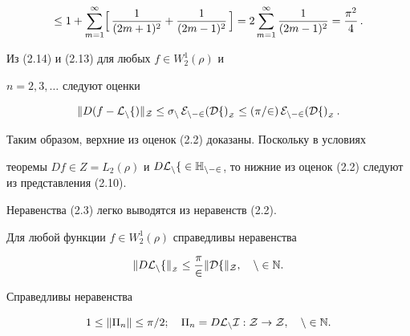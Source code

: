 \begin{pf}
\begin{gather}
%


\le 1+ \sum_{m=1}^\infty \Bigl[\,


\frac{1}{(2m+1)^2} + \frac{1}{(2m-1)^2}\, \Bigr]=


2 \sum_{m=1}^\infty \frac{1}{(2m-1)^2} =


\frac{\pi^2}{4}\, .


\end{gather}


Из (2.14) и (2.13) для любых $f\in W_2^1(\rho )$ и


$n=2,3,\dotsc $ следуют оценки


\begin{equation}


\|D(f-\cal{L}_nf)\|_Z\le \sigma_n\, E_{n-2}(Df)_{{}_Z}\le


(\pi /2)\, E_{n-2}(Df)_{{}_Z}\, .


\end{equation}





Таким образом, верхние из оценок (2.2) доказаны. Поскольку в условиях


теоремы $Df\in Z=L_2(\rho )$ и $D\cal{L}_nf\in


\Bbb{H}_{n-2}$, то нижние из оценок (2.2) следуют из представления (2.10).


Неравенства (2.3) легко выводятся из неравенств (2.2).


\end{pf}





\begin{lem}


Для любой функции $f\in W_2^1(\rho )$ справедливы неравенства


\begin{equation}


\|D\cal{L}_nf\|_{{}_Z}\le \frac{\pi}{2}\|Df\|_Z,\quad n\in \Bbb{N} .


\end{equation}


\end{lem}





\begin{cornonum}


Справедливы неравенства


\begin{equation}


1\le \|\Pi_n\|\le \pi /2;\quad


\Pi_n=D\cal{L}_nI:Z\to Z,\quad n\in \Bbb{N}.


\end{equation}


\end{cornonum}






